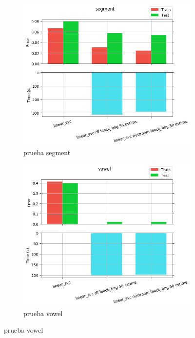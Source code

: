 \begin{figure}[ht]
  \centering
  \begin{subfigure}[b]{0.5\linewidth}
    \centering\includegraphics[width=\imgscale\linewidth]{Figures/2_6/segment}
    \caption{prueba segment}
    \label{fig:2_6_segment}
  \end{subfigure}%
  \begin{subfigure}[b]{0.5\linewidth}
    \centering\includegraphics[width=\imgscale\linewidth]{Figures/2_6/vowel}
    \caption{prueba vowel}
    \label{fig:2_6_vowel}
  \end{subfigure}
\end{figure}
